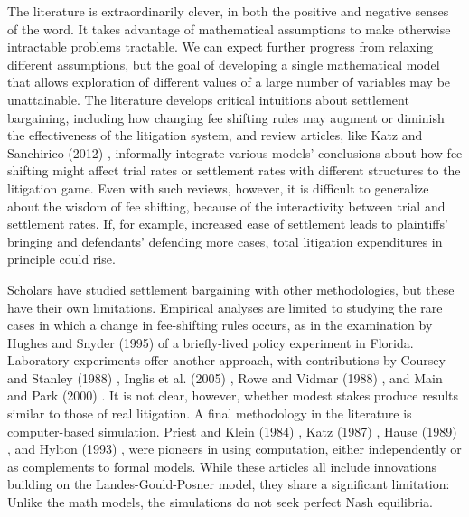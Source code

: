 \documentclass{article}
\begin{document}
The literature is extraordinarily clever, in both the positive and negative senses of the word. It takes advantage of mathematical assumptions to make otherwise intractable problems tractable. We can expect further progress from relaxing different assumptions, but the goal of developing a single mathematical model that allows exploration of different values of a large number of variables may be unattainable. The literature develops critical intuitions about settlement bargaining, including how changing fee shifting rules may augment or diminish the effectiveness of the litigation system, and review articles, like Katz and Sanchirico (2012) \cite{katzsanchirico}, informally integrate various models' conclusions about how fee shifting might affect trial rates or settlement rates with different structures to the litigation game. Even with such reviews, however, it is difficult to generalize about the wisdom of fee shifting, because of the interactivity between trial and settlement rates. If, for example, increased ease of settlement leads to plaintiffs' bringing and defendants' defending more cases, total litigation expenditures in principle could rise. 

Scholars have studied settlement bargaining with other methodologies, but these have their own limitations. Empirical analyses are limited to studying the rare cases in which a change in fee-shifting rules occurs, as in the examination by Hughes and Snyder (1995) \cite{hughessnyder} of a briefly-lived policy experiment in Florida. Laboratory experiments offer another approach, with contributions by Coursey and Stanley (1988) \cite{courseystanley}, Inglis et al. (2005) \cite{inglisetal},  Rowe and Vidmar (1988) \cite{rowevidmar}, and Main and Park (2000) \cite{mainpark}. It is not clear, however, whether modest stakes produce results similar to those of real litigation. A final methodology in the literature is computer-based simulation. Priest and Klein (1984) \cite{priestklein}, Katz (1987) \cite{katz}, Hause (1989) \cite{hause}, and Hylton (1993) \cite{hylton}, were pioneers in using computation, either independently or as complements to formal models. While these articles all include innovations building on the Landes-Gould-Posner model, they share a significant limitation: Unlike the math models, the simulations do not seek perfect Nash equilibria.
\end{document}
